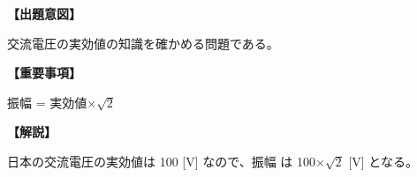 \noindent \textbf{【出題意図】}

\noindent 交流電圧の実効値の知識を確かめる問題である。

\vspace{1em}
\noindent \textbf{【重要事項】}

\medskip
振幅 = 実効値$\times \sqrt{2}$

\vspace{1em}
\noindent \textbf{【解説】}

\noindent 日本の交流電圧の実効値は 100 [V] なので、振幅 は 100$\times \sqrt{2}$ [V] となる。
